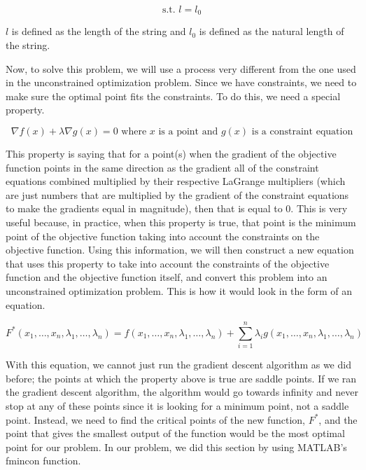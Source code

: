 \documentclass[10pt,letterpaper,onecolumn,report]{tau-class/tau}
\begin{document}
        \begin{equation}
            \text{s.t. } l = l_0
        \end{equation}

        \(l\) is defined as the length of the string and \(l_0\) is defined as the natural length of the string.
        
        Now, to solve this problem, we will use a process very different from the one used in the unconstrained optimization problem. Since we have constraints, we need to make sure the optimal point fits the constraints. To do this, we need a special property.

        \begin{equation}
            \nabla f(x) + \lambda \nabla g(x) = 0
            \text{ where } x \text{ is a point and } g(x) \text{ is a constraint equation}
        \end{equation}

        This property is saying that for a point(s) when the gradient of the objective function points in the same direction as the gradient all of the constraint equations combined multiplied by their respective LaGrange multipliers (which are just numbers that are multiplied by the gradient of the constraint equations to make the gradients equal in magnitude), then that is equal to 0. This is very useful because, in practice, when this property is true, that point is the minimum point of the objective function taking into account the constraints on the objective function. Using this information, we will then construct a new equation that uses this property to take into account the constraints of the objective function and the objective function itself, and convert this problem into an unconstrained optimization problem. This is how it would look in the form of an equation.

        \begin{equation}
            F^*(x_1, \ldots, x_n, \lambda_1, \ldots, \lambda_n) = f(x_1, \ldots, x_n, \lambda_1, \ldots, \lambda_n) + \sum_{i=1}^n \lambda_i g(x_1, \ldots, x_n, \lambda_1, \ldots, \lambda_n)
        \end{equation}

        With this equation, we cannot just run the gradient descent algorithm as we did before; the points at which the property above is true are saddle points. If we ran the gradient descent algorithm, the algorithm would go towards infinity and never stop at any of these points since it is looking for a minimum point, not a saddle point. Instead, we need to find the critical points of the new function, \(F^*\), and the point that gives the smallest output of the function would be the most optimal point for our problem. In our problem, we did this section by using MATLAB’s fmincon function.
        
\end{document}
